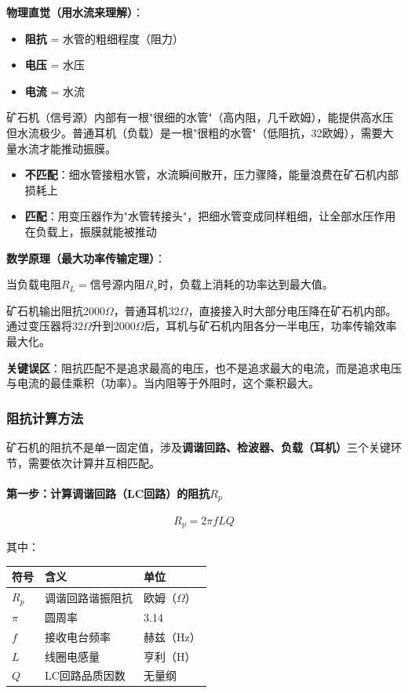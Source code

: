 \textbf{物理直觉（用水流来理解）}：
\begin{itemize}
    \item \textbf{阻抗} = 水管的粗细程度（阻力）
    \item \textbf{电压} = 水压
    \item \textbf{电流} = 水流
\end{itemize}

矿石机（信号源）内部有一根"很细的水管"（高内阻，几千欧姆），能提供高水压但水流极少。普通耳机（负载）是一根"很粗的水管"（低阻抗，32欧姆），需要大量水流才能推动振膜。

\begin{itemize}
    \item \textbf{不匹配}：细水管接粗水管，水流瞬间散开，压力骤降，能量浪费在矿石机内部损耗上
    \item \textbf{匹配}：用变压器作为"水管转接头"，把细水管变成同样粗细，让全部水压作用在负载上，振膜就能被推动
\end{itemize}

\textbf{数学原理（最大功率传输定理）}：

当负载电阻$R_L = $信号源内阻$R_s$时，负载上消耗的功率达到最大值。

矿石机输出阻抗2000$\Omega$，普通耳机32$\Omega$，直接接入时大部分电压降在矿石机内部。通过变压器将32$\Omega$升到2000$\Omega$后，耳机与矿石机内阻各分一半电压，功率传输效率最大化。

\textbf{关键误区}：阻抗匹配不是追求最高的电压，也不是追求最大的电流，而是追求电压与电流的最佳乘积（功率）。当内阻等于外阻时，这个乘积最大。

\subsubsection{阻抗计算方法}
\label{sec:impedance_calculation}

矿石机的阻抗不是单一固定值，涉及\textbf{调谐回路、检波器、负载（耳机）}三个关键环节，需要依次计算并互相匹配。

\paragraph{第一步：计算调谐回路（LC回路）的阻抗$R_p$}

\begin{equation}
R_p = 2\pi f L Q
\label{eq:tuning_impedance}
\end{equation}

其中：
\begin{center}
\begin{tabular}{|p{2cm}|p{3cm}|p{3cm}|}
\hline
\textbf{符号} & \textbf{含义} & \textbf{单位} \\
\hline
$R_p$ & 调谐回路谐振阻抗 & 欧姆（$\Omega$） \\
$\pi$ & 圆周率 & 3.14 \\
$f$ & 接收电台频率 & 赫兹（Hz） \\
$L$ & 线圈电感量 & 亨利（H） \\
$Q$ & LC回路品质因数 & 无量纲 \\
\hline
\end{tabular}
\end{center}

